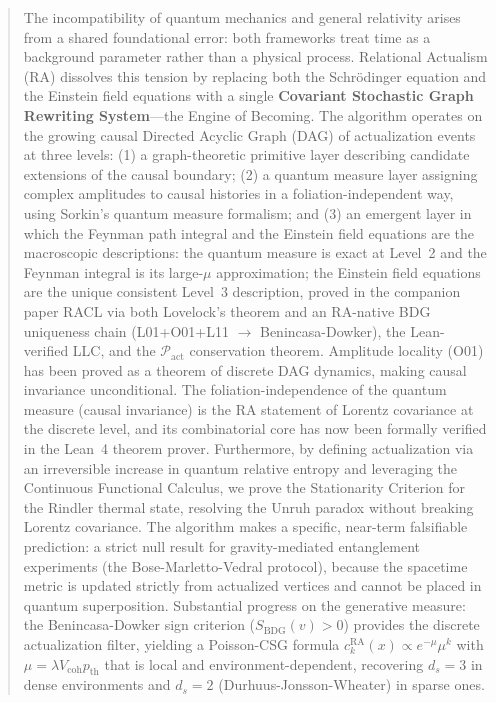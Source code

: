 \documentclass[11pt,a4paper]{article}
\theoremstyle{plain}
\theoremstyle{definition}
\theoremstyle{remark}
\begin{document}
\begin{abstract}
The incompatibility of quantum mechanics and general relativity arises from a
shared foundational error: both frameworks treat time as a background parameter
rather than a physical process. Relational Actualism (RA) dissolves this tension
by replacing both the Schr\"{o}dinger equation and the Einstein field equations
with a single \textbf{Covariant Stochastic Graph Rewriting System}---the Engine
of Becoming. The algorithm operates on the growing causal Directed Acyclic Graph
(DAG) of actualization events at three levels: (1) a graph-theoretic primitive
layer describing candidate extensions of the causal boundary; (2) a quantum
measure layer assigning complex amplitudes to causal histories in a
foliation-independent way, using Sorkin's quantum measure formalism; and (3) an
emergent layer in which the Feynman path integral and the Einstein field equations
are the macroscopic descriptions: the quantum measure is exact at Level~2 and
the Feynman integral is its large-$\mu$ approximation; the Einstein field
equations are the unique consistent Level~3 description, proved in the companion
paper RACL via both Lovelock's theorem and an RA-native BDG uniqueness chain
(L01+O01+L11 $\to$ Benincasa-Dowker),
the Lean-verified LLC, and the $\mathcal{P}_{\mathrm{act}}$ conservation theorem. Amplitude locality (O01) has been proved as a theorem of discrete DAG dynamics, making causal invariance unconditional. The foliation-independence of the quantum measure
(causal invariance) is the RA statement of Lorentz covariance at the discrete
level, and its combinatorial core has now been formally verified in the Lean~4
theorem prover. Furthermore, by defining actualization via an irreversible
increase in quantum relative entropy and leveraging the Continuous Functional
Calculus, we prove the Stationarity Criterion for the Rindler thermal state,
resolving the Unruh paradox without breaking Lorentz covariance. The algorithm
makes a specific, near-term falsifiable prediction: a strict null result for
gravity-mediated entanglement experiments (the Bose-Marletto-Vedral protocol),
because the spacetime metric is updated strictly from actualized vertices and
cannot be placed in quantum superposition. Substantial progress on the
generative measure: the Benincasa-Dowker sign criterion
($S_{\mathrm{BDG}}(v) > 0$) provides the discrete actualization filter,
yielding a Poisson-CSG formula $c_k^{\mathrm{RA}}(x) \propto e^{-\mu}\mu^k$
with $\mu = \lambda V_{\mathrm{coh}} p_{\mathrm{th}}$ that is local and
environment-dependent, recovering $d_s = 3$ in dense environments and
$d_s = 2$ (Durhuus-Jonsson-Wheater) in sparse ones.


\end{abstract}
\end{document}
